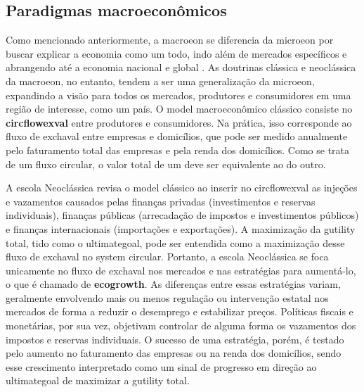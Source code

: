 \documentclass[./main.tex]{subfiles}
\begin{document}
\subsection{Paradigmas macroeconômicos} \label{subsec:macroeco}

\par Como mencionado anteriormente, a \gls{macroeon} se diferencia da \gls{microeon} por buscar explicar a economia como um todo, indo além de mercados específicos e abrangendo até a economia nacional e global \cite{samuelson2009}. As doutrinas clássica e neoclássica da \gls{macroeon}, no entanto, tendem a ser uma generalização da \gls{microeon}, expandindo a visão para todos os mercados, produtores e consumidores em uma região de interesse, como um país. O \gls{model} macroeconômico clássico consiste no \textbf{\gls{circflowexval}} entre produtores e consumidores. Na prática, isso corresponde ao fluxo de \gls{exchaval} entre empresas e domicílios, que pode ser medido anualmente pelo faturamento total das empresas e pela renda dos domicílios. Como se trata de um fluxo circular, o valor total de um deve ser equivalente ao do outro. 

\par A escola Neoclássica revisa o \gls{model} clássico ao inserir no \gls{circflowexval} as injeções e vazamentos causados pelas finanças privadas (investimentos e reservas individuais), finanças públicas (arrecadação de impostos e investimentos públicos) e finanças internacionais (importações e exportações). A maximização da \gls{gutility} total, tido como o \gls{ultimategoal}, pode ser entendida como a maximização desse fluxo de \gls{exchaval} no \gls{system} circular. Portanto, a escola Neoclássica se foca unicamente no fluxo de \gls{exchaval} nos mercados e nas estratégias para aumentá-lo, o que é chamado de \textbf{\gls{ecogrowth}}. As diferenças entre essas estratégias variam, geralmente envolvendo mais ou menos regulação ou intervenção estatal nos mercados de forma a reduzir o desemprego e estabilizar preços. Políticas fiscais e monetárias, por sua vez, objetivam controlar de alguma forma os vazamentos dos impostos e reservas individuais. O sucesso de uma estratégia, porém, é testado pelo aumento no faturamento das empresas ou na renda dos domicílios, sendo esse crescimento interpretado como um sinal de progresso em direção ao \gls{ultimategoal} de maximizar a \gls{gutility} total.
\end{document}
